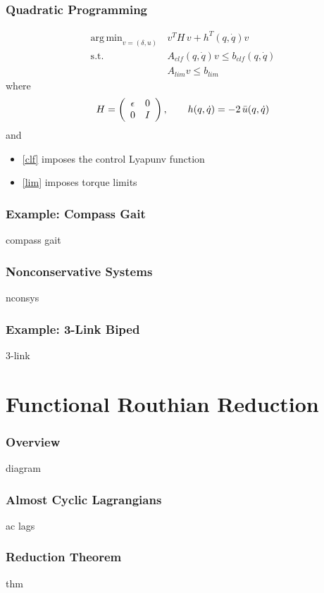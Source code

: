 \documentclass{beamer}
\DeclareMathOperator*{\argmin}{arg\,min}
\begin{document}
\begin{frame}
  \frametitle{Quadratic Programming}
  \begin{align}
    \nonumber
    \argmin_{v = (\delta, u)}  \, & v^T \! H \, v + h^T(q, \dot q) v\\
    \label{clf} \tag{clf}
    \mbox{s.t. } & A_{\mathit{clf}}(q, \dot q) v \leq b_{\mathit{clf}}(q, \dot q)\\
    \label{lim} \tag{lim}
    & A_{\mathit{lim}} v \leq b_{\mathit{lim}}
  \end{align}
  where
  \begin{align*}
    H = \left(\begin{array}{c c}\epsilon & 0\\ 0 & I\end{array}\right), \qquad h(q, \dot q) = -2 \, \bar u(q, \dot q)
  \end{align*}
  and
  \begin{itemize}
  \item\eqref{clf} imposes the control Lyapunv function
  \item\eqref{lim} imposes torque limits
  \end{itemize}
\end{frame}

\begin{frame}
  \frametitle{Example: Compass Gait}
  compass gait
\end{frame}

\begin{frame}
  \frametitle{Nonconservative Systems}
  nconsys
\end{frame}

\begin{frame}
  \frametitle{Example: 3-Link Biped}
  3-link
\end{frame}

\section{Functional Routhian Reduction}
\begin{frame}
  \frametitle{Overview}
  diagram
\end{frame}

\begin{frame}
  \frametitle{Almost Cyclic Lagrangians}
  ac lags
\end{frame}

\begin{frame}
  \frametitle{Reduction Theorem}
  thm
\end{frame}
\end{document}
